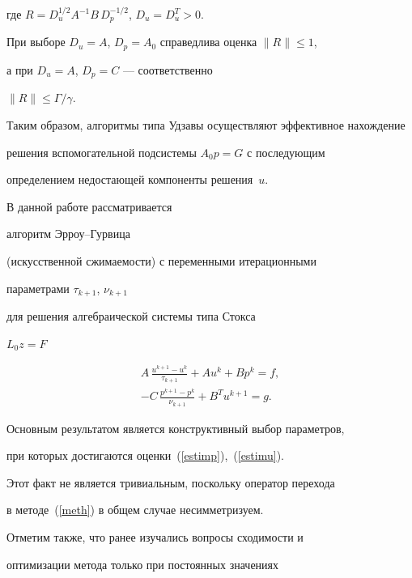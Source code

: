 где $R = D_u^{1/2} A^{-1} B\,D_p^{-1/2}$, $D_u = D_u^T > 0$.


При выборе $ D_u = A$, $D_p = A_0$ справедлива оценка $\|R\|\leq 1$,


а при $D_u = A$, $D_p = C$ --- соответственно


$\| R \| \leq \Gamma / \gamma$.





Таким образом, алгоритмы типа Удзавы осуществляют эффективное нахождение


решения вспомогательной подсистемы $A_0 p = G$ с последующим


определением недостающей компоненты решения~$u$.





В данной работе рассматривается


алгоритм Эрроу--Гурвица~\cite{AGU}


(искусственной сжимаемости) с переменными итерационными 


параметрами $\tau_{k+1}$, $\nu_{k+1}$


для решения алгебраической системы типа Стокса


$L_{0} z = F$


\begin{equation}


\label{meth}


\begin{array}{c}


A \, \frac{u^{k+1}-u^k}{\tau_{k+1}} +A u^k +B p^k = f, \\


-C\,\frac{ p^{k+1} - p^k}{\nu_{k+1} } + B^T u^{k+1} = g.


\end{array}


\end{equation}


Основным результатом является конструктивный выбор параметров,


при которых достигаются оценки~(\ref{estimp}),~(\ref{estimu}).


Этот факт не является тривиальным, поскольку оператор перехода


в методе~(\ref{meth}) в общем случае несимметризуем.


Отметим также, что ранее изучались вопросы сходимости и


оптимизации метода только при постоянных значениях


